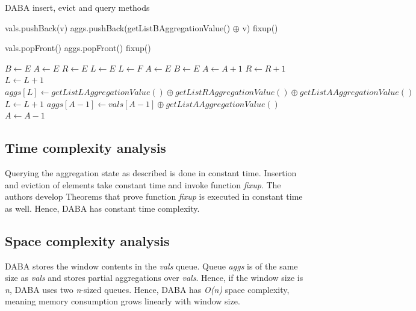 \begin{algorithm}
    \caption{DABA insert, evict and query methods}
    \label{pseudo:daba}
    \begin{algorithmic}[1]
            \State {}
        \EndFunction
        
            \State vals.pushBack(v)
            \State aggs.pushBack(getListBAggregationValue() $\oplus$ v)
            \State fixup()
        \EndFunction
        
            \State vals.popFront()
            \State aggs.popFront()
            \State fixup()
        \EndFunction
        
            \State $B \gets E$
            \State $A \gets E$
            \State $R \gets E$
            \State $L \gets E$
        \Else
                \State $L \gets F$
                \State $A \gets E$
                \State $B \gets E$
            \EndIf
                \State $A \gets A + 1$
                \State $R \gets R + 1$
                \State $L \gets L + 1$
            \Else
                \State $aggs[L] \gets getListLAggregationValue() \oplus getListRAggregationValue() \oplus getListAAggregationValue()$
                \State $L \gets L + 1$
                \State $aggs[A - 1] \gets vals[A - 1] \oplus getListAAggregationValue()$
                \State $A \gets A - 1$
            \EndIf
        \EndIf
        \EndFunction
    \end{algorithmic}
\end{algorithm}


\subsection*{Time complexity analysis}
Querying the aggregation state as described is done in constant time. Insertion and eviction of elements take constant time and invoke function \textit{fixup}. The authors develop Theorems that prove function \textit{fixup} is executed in constant time as well. Hence, DABA has constant time complexity.

\subsection*{Space complexity analysis}
DABA stores the window contents in the \textit{vals} queue. Queue \textit{aggs} is of the same size as \textit{vals} and stores partial aggregations over \textit{vals}. Hence, if the window size is \textit{n}, DABA uses two \textit{n}-sized queues. Hence, DABA has \textit{O(n)} space complexity, meaning memory consumption grows linearly with window size.

